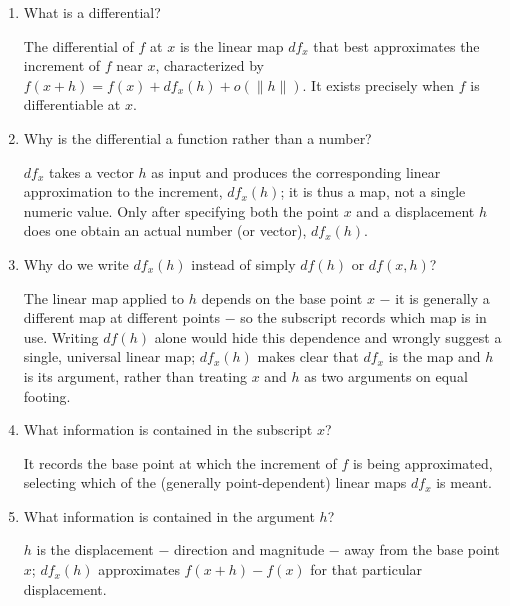 \documentclass{self-check}
\begin{document}
\begin{enumerate}[resume, leftmargin=*, itemsep=8pt]

\item What is a differential?
\begin{answer}
The differential of \(f\) at \(x\) is the linear map \(df_x\) that best approximates the increment of \(f\) near \(x\), characterized by \(f(x+h)=f(x)+df_x(h)+o(\|h\|)\). It exists precisely when \(f\) is differentiable at \(x\).
\end{answer}

\item Why is the differential a function rather than a number?
\begin{answer}
\(df_x\) takes a vector \(h\) as input and produces the corresponding linear approximation to the increment, \(df_x(h)\); it is thus a map, not a single numeric value. Only after specifying both the point \(x\) and a displacement \(h\) does one obtain an actual number (or vector), \(df_x(h)\).
\end{answer}

\item Why do we write \(df_x(h)\) instead of simply \(df(h)\) or \(df(x,h)\)?
\begin{answer}
The linear map applied to \(h\) depends on the base point \(x\) \(-\) it is generally a different map at different points \(-\) so the subscript records which map is in use. Writing \(df(h)\) alone would hide this dependence and wrongly suggest a single, universal linear map; \(df_x(h)\) makes clear that \(df_x\) is the map and \(h\) is its argument, rather than treating \(x\) and \(h\) as two arguments on equal footing.
\end{answer}

\item What information is contained in the subscript \(x\)?
\begin{answer}
It records the base point at which the increment of \(f\) is being approximated, selecting which of the (generally point-dependent) linear maps \(df_x\) is meant.
\end{answer}

\item What information is contained in the argument \(h\)?
\begin{answer}
\(h\) is the displacement \(-\) direction and magnitude \(-\) away from the base point \(x\); \(df_x(h)\) approximates \(f(x+h)-f(x)\) for that particular displacement.
\end{answer}


\end{enumerate}
\end{document}
